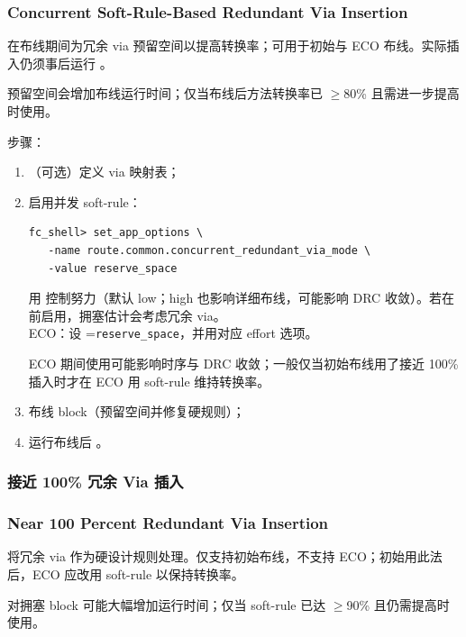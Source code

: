 \subsubsection*{Concurrent Soft-Rule-Based Redundant Via Insertion}

在布线期间为冗余 via 预留空间以提高转换率；可用于初始与 ECO 布线。实际插入仍须事后运行 。

\begin{noteBox}
预留空间会增加布线运行时间；仅当布线后方法转换率已 $\ge$80\% 且需进一步提高时使用。
\end{noteBox}

步骤：
\begin{enumerate}
  \item （可选）定义 via 映射表；
  \item 启用并发 soft-rule：
\begin{lstlisting}
fc_shell> set_app_options \
   -name route.common.concurrent_redundant_via_mode \
   -value reserve_space
\end{lstlisting}
        用  控制努力（默认 low；high 也影响详细布线，可能影响 DRC 收敛）。若在  前启用，拥塞估计会考虑冗余 via。\\
        ECO：设 =\texttt{reserve\_space}，并用对应 effort 选项。
\begin{noteBox}
ECO 期间使用可能影响时序与 DRC 收敛；一般仅当初始布线用了接近 100\% 插入时才在 ECO 用 soft-rule 维持转换率。
\end{noteBox}
  \item 布线 block（预留空间并修复硬规则）；
  \item 运行布线后 。
\end{enumerate}

\subsubsection{接近 100\% 冗余 Via 插入}
\subsubsection*{Near 100 Percent Redundant Via Insertion}

将冗余 via 作为硬设计规则处理。仅支持初始布线，不支持 ECO；初始用此法后，ECO 应改用 soft-rule 以保持转换率。

\begin{noteBox}
对拥塞 block 可能大幅增加运行时间；仅当 soft-rule 已达 $\ge$90\% 且仍需提高时使用。
\end{noteBox}

